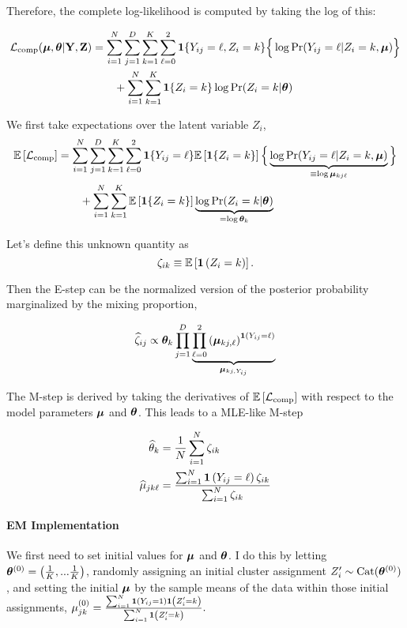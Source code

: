 \documentclass[11pt]{article}
\begin{document}
Therefore, the complete log-likelihood is computed by taking the log of this:


\begin{align}
\mathcal{L}_{\text{comp}}(\bm{\mu}, \bm{\theta}|\mathbf{Y}, \mathbf{Z})
& = \sum^{N}_{i=1}\sum^{D}_{j=1}\sum^{K}_{k=1}\sum^{2}_{\ell = 0}
\bm{1}\{Y_{ij} = \ell, Z_{i} = k\}\Big\{
\log \Pr(Y_{ij} = \ell | Z_{i} = k, \bm{\mu})
\Big\} \nonumber\\
& \qquad +
\sum^N_{i=1}\sum^{K}_{k=1}\bm{1}\{Z_{i} = k\}\log \Pr(Z_{i} = k | \bm{\theta})
\end{align}

We first take expectations over the latent variable $Z_{i}$,
\begin{align}
\mathbb{E}\left[\mathcal{L}_{\text{comp}}\right]
& = \sum^{N}_{i=1}\sum^{D}_{j=1}\sum^{K}_{k=1}\sum^{2}_{\ell = 0}
\bm{1}\{Y_{ij} = \ell\} \mathbb{E}\left[\bm{1}\{Z_{i} = k\}\right]\Big\{
\underbrace{\log \Pr(Y_{ij} = \ell | Z_{i} = k, \bm{\mu})}_{\equiv \log\bm{\mu}_{kj\ell}}
\Big\} \nonumber\\
& \qquad +
\sum^{N}_{i=1}\sum^{K}_{k=1}\mathbb{E}\left[\bm{1}\{Z_{i} = k\}\right]\underbrace{\log \Pr(Z_{i} = k | \bm{\theta})}_{= \log \bm{\theta}_{k}}
\end{align}

 Let's define this unknown quantity as 
\[\zeta_{ik} \equiv \mathbb{E}\left[\bm{1}\left(Z_i = k\right)\right].\]

Then the E-step can be the normalized version of the posterior probability marginalized by the mixing proportion,

\begin{align}
\widehat{\zeta}_{ij} \propto \bm{\theta}_k\prod^D_{j = 1}\underbrace{\prod^{2}_{\ell = 0}\left(\bm{\mu}_{kj,\ell}\right)^{\bm{1}\left(Y_{ij} = \ell\right)}}_{\bm{\mu}_{kj, Y_{ij}}}
\end{align}

The M-step is derived by taking the derivatives of \(\mathbb{E}\left[\mathcal{L}_{\text{comp}}\right]\) with respect to the model parameters \(\bm{\mu}\) and \(\bm{\theta}\). This leads to a MLE-like M-step

\begin{align}
\widehat{\theta}_{k} &= \frac{1}{N}\sum^N_{i = 1}\zeta_{ik}\\
\widehat{\mu}_{jk\ell} &= \frac{\sum^N_{i=1}\bm{1}\left(Y_{ij} = \ell\right)\zeta_{ik}}{\sum^{N}_{i=1}\zeta_{ik}}
\end{align}


\paragraph{EM Implementation} We first need to set initial values for \(\bm{\mu}\) and \(\bm{\theta}\). I do this by letting \(\bm{\theta}^{(0)} = \left(\frac{1}{K},...\frac{1}{K}\right)\), randomly assigning an initial cluster assignment \(Z_i^\prime \sim \text{Cat}(\bm{\theta}^{(0)})\), and setting the initial \(\bm{\mu}\) by the sample means of the data within those initial assignments, \(\mu_{jk}^{(0)} = \frac{\sum_{i=1}^{N}\bm{1}\left(Y_{ij} = 1\right)\bm{1}\left(Z_{i}^{\prime} = k\right)}{\sum_{i=1}^{N}\bm{1}\left(Z_{i}^{\prime} = k\right)}.\) 
\end{document}
